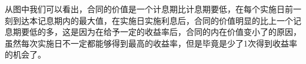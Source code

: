 从图中我们可以看出，合同的价值是一个计息期比计息期要低，在每个实施日前一刻到达本记息期内的最大值，在实施日实施利息后，合同的价值明显的比上一个记息期要低的多，这是因为在给予一定的收益率后，合同的内在价值变小了的原因，虽然每次实施日不一定都能够得到最高的收益率，但是毕竟是少了1次得到收益率的机会了。

